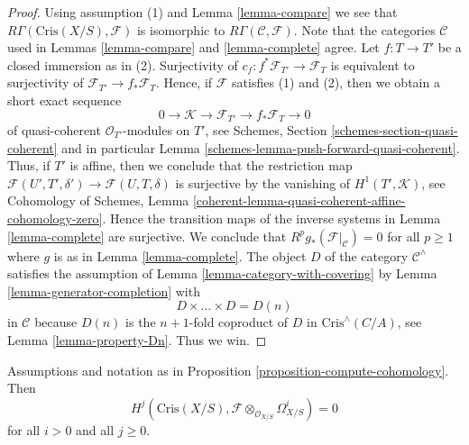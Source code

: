 \begin{proof}
Using assumption (1) and Lemma \ref{lemma-compare} we see that
$R\Gamma(\text{Cris}(X/S), \mathcal{F})$ is isomorphic to
$R\Gamma(\mathcal{C}, \mathcal{F})$. Note that the categories
$\mathcal{C}$ used in Lemmas \ref{lemma-compare} and \ref{lemma-complete}
agree. Let $f : T \to T'$ be a closed immersion as in (2). Surjectivity
of $c_f : f^*\mathcal{F}_{T'} \to \mathcal{F}_T$ is equivalent to
surjectivity of $\mathcal{F}_{T'} \to f_*\mathcal{F}_T$. Hence, if
$\mathcal{F}$ satisfies (1) and (2), then we obtain a short exact sequence
$$
0 \to \mathcal{K} \to \mathcal{F}_{T'} \to f_*\mathcal{F}_T \to 0
$$
of quasi-coherent $\mathcal{O}_{T'}$-modules on $T'$, see
Schemes, Section \ref{schemes-section-quasi-coherent} and in particular
Lemma \ref{schemes-lemma-push-forward-quasi-coherent}.
Thus, if $T'$ is affine, then we conclude that the restriction map
$\mathcal{F}(U', T', \delta') \to \mathcal{F}(U, T, \delta)$
is surjective by the vanishing of $H^1(T', \mathcal{K})$, see
Cohomology of Schemes, Lemma
\ref{coherent-lemma-quasi-coherent-affine-cohomology-zero}.
Hence the transition maps of the inverse systems in Lemma \ref{lemma-complete}
are surjective. We conclude that
$R^pg_*(\mathcal{F}|_\mathcal{C}) = 0$ for all $p \geq 1$
where $g$ is as in Lemma \ref{lemma-complete}.
The object $D$ of the category $\mathcal{C}^\wedge$
satisfies the assumption of Lemma \ref{lemma-category-with-covering} by
Lemma \ref{lemma-generator-completion}
with
$$
D \times \ldots \times D = D(n)
$$
in $\mathcal{C}$ because $D(n)$ is the $n + 1$-fold coproduct of
$D$ in $\text{Cris}^\wedge(C/A)$, see Lemma \ref{lemma-property-Dn}.
Thus we win.
\end{proof}

\begin{lemma}
\label{lemma-cohomology-is-zero}
Assumptions and notation as in
Proposition \ref{proposition-compute-cohomology}.
Then
$$
H^j(\text{Cris}(X/S), \mathcal{F} \otimes_{\mathcal{O}_{X/S}} \Omega^i_{X/S})
= 0
$$
for all $i > 0$ and all $j \geq 0$.
\end{lemma}

